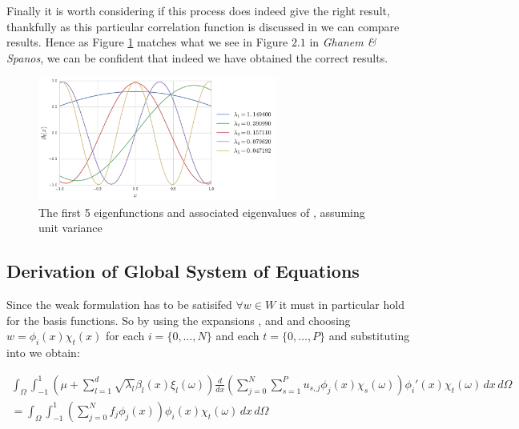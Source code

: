 Finally it is worth considering if this process does indeed give the right
result, thankfully as this particular correlation function
 is discussed in
\cite{stochastic-fem} we can compare results. Hence as Figure
\ref{fig:kle-eigenfunctions} matches what we see in Figure $2.1$ in
\textit{Ghanem \& Spanos}, we can be confident that indeed we have obtained the
correct results.

\begin{figure}
    \centering
    \includegraphics[width=0.7\textwidth]{img/kle-eigenfunctions.pdf}
    \caption{The first 5 eigenfunctions and associated eigenvalues of
             , assuming unit
             variance}
    \label{fig:kle-eigenfunctions}
\end{figure}

\subsection{Derivation of Global System of Equations}

Since the weak formulation  has to be satisifed
$\forall w \in W$ it must in particular hold for the basis functions. So by
using the expansions ,
 and  and
choosing $w = \phi_i(x)\chi_t(x)$ for each $i = \{0,\ldots,N\}$ and each $t =
\{0,\ldots,P\}$ and substituting into  we
obtain:

\begin{align*}
    \int_{\Omega}\int_{-1}^1
      \left(\mu + \sum_{l=1}^d\sqrt{\lambda_l}\beta_l(x)\xi_l(\omega)\right)
      \frac{d}{dx}\left(\sum_{j=0}^N\sum_{s=1}^Pu_{s,j}\phi_j(x)\chi_s(\omega)\right)
      \phi_i'(x)\chi_t(\omega)\, dx\, d\Omega \\ =
    \int_{\Omega}\int_{-1}^1
      \left(\sum_{j=0}^Nf_j\phi_j(x)\right)
      \phi_i(x)\chi_t(\omega)\, dx\, d\Omega
\end{align*}

